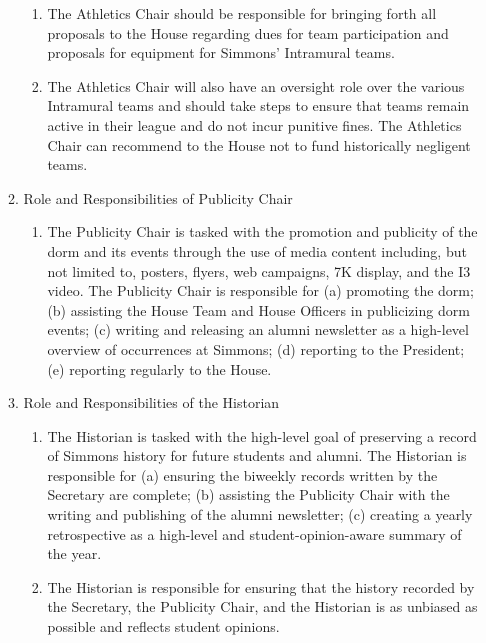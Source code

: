 \documentclass[letterpaper]{article}
\begin{document}
\begin{enumerate}
\begin{enumerate}
\begin{enumerate}
\item The Athletics Chair should be responsible for bringing forth all proposals to the House regarding dues for team participation and proposals for equipment for Simmons' Intramural teams.

\item The Athletics Chair will also have an oversight role over the various Intramural teams and should take steps to ensure that teams remain active in their league and do not incur punitive fines. The Athletics Chair can recommend to the House not to fund historically negligent teams.

\end{enumerate}

\item Role and Responsibilities of Publicity Chair

\begin{enumerate}

\item The Publicity Chair is tasked with the promotion and publicity of the dorm and its events through the use of media content including, but not limited to, posters, flyers, web campaigns, 7K display, and the I3 video. The Publicity Chair is responsible for (a) promoting the dorm; (b) assisting the House Team and House Officers in publicizing dorm events; (c) writing and releasing an alumni newsletter as a high-level overview of occurrences at Simmons; (d) reporting to the President; (e) reporting regularly to the House.

\end{enumerate}

\item Role and Responsibilities of the Historian

\begin{enumerate}

\item The Historian is tasked with the high-level goal of preserving a record of Simmons history for future students and alumni. The Historian is responsible for (a) ensuring the biweekly records written by the Secretary are complete; (b) assisting the Publicity Chair with the writing and publishing of the alumni newsletter; (c) creating a yearly retrospective as a high-level and student-opinion-aware summary of the year.

\item The Historian is responsible for ensuring that the history recorded by the Secretary, the Publicity Chair, and the Historian is as unbiased as possible and reflects student opinions.


\end{enumerate}
\end{enumerate}
\end{enumerate}
\end{document}
